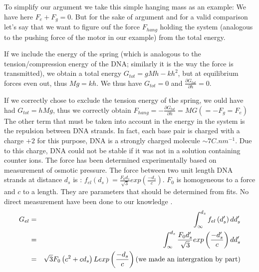 \documentclass{article}
\begin{document}
To simplify our argument we take this simple hanging mass as an example: We have here $F_e + F_g = 0$. But for the sake of argument and for a valid comparison let's say that we want to figure ouf the force $F_{hang}$ holding the system (analogous to the pushing force of the motor in our example) from the total energy.

If we include the energy of the spring (which is analogous to the tension/compression energy of the DNA; similarly it is the way the force is transmitted), we obtain a total energy $G_{tot} = gMh - kh^2$, but at equilibrium forces even out, thus $Mg = kh$. We thus have $G_{tot} = 0$ and $\frac{\partial G_{tot}}{\partial h} = 0$.

If we correctly chose to exclude the tension energy of the spring, we ould have had $G_{tot} = hMg$, thus we correctly obtain $F_{hang} = -\frac{\partial G_{tot}}{\partial h} = MG \left(= -F_g = F_e \right)$ \\

The other term that must be taken into account in the energy in the system is the repulsion between DNA strands. In fact, each base pair is charged with a charge $+2$ for this purpose, DNA is a strongly charged molecule $ \sim 7 C.nm^{-1} $. Due to this charge, DNA could not be stable if it was not in a solution containing counter ions. The force has been determined experimentally based on measurement of osmotic pressure. The force between two unit length DNA strands at distance $d_s$ is : $f_{el} \left(d_s\right) = \frac{F_0 d_s}{\sqrt{3}} exp \left(\frac{-d_s}{c}\right) $. $F_0$ is homogeneous to a force and $c$ to a length. They are parameters that should be determined from fits. No direct measurement have been done to our knowledge \cite{purohit2003}.
\begin{eqnarray}
    G_{el} &=& \int_{\infty}^{d_s} f_{el} \left( d'_s \right) dd'_s \\
    & = & \int_{\infty}^{d_s} \frac{F_0 d'_s}{\sqrt{3}} exp \left(\frac{-d'_s}{c}\right) dd'_s \\
    & = & \sqrt{3} F_0 \left( c^2 + cd_s \right) L exp \left( \frac{- d_s}{c} \right) \textnormal{(we made an intergration by part)} \label{eq:gelec}
\end{eqnarray}
\end{document}
